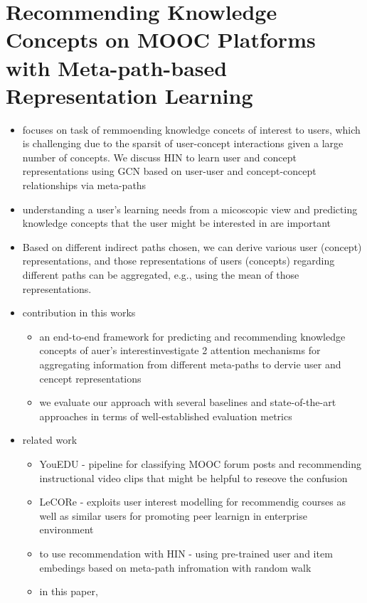 \documentclass{report}
\begin{document}
\section{Recommending Knowledge Concepts on MOOC Platforms with Meta-path-based Representation Learning}
\begin{itemize}
    \item focuses on  task of remmoending knowledge concets of interest to users, which is challenging due to the sparsit of user-concept interactions given a large number of concepts. We discuss HIN to learn user and concept representations using GCN based on user-user and concept-concept relationships via meta-paths
    \item understanding a user's learning needs from a micoscopic view and predicting knowledge concepts that the user might be interested in are important
    \item Based on different indirect paths chosen, we can derive various user (concept) representations, and those representations of users (concepts) regarding different paths can be aggregated, e.g., using the mean of those representations.
    \item contribution in this works
    \begin{itemize}
        \item an end-to-end framework for predicting and recommending knowledge concepts of auer's interestinvestigate 2 attention mechanisms for aggregating information from different meta-paths to dervie user and cencept representations
        \item we evaluate our approach with several baselines and state-of-the-art approaches in terms of well-established evaluation metrics
    \end{itemize}
    \item related work
    \begin{itemize}
        \item YouEDU - pipeline for classifying MOOC forum posts and recommending instructional video clips that might be helpful to reseove the confusion
        \item LeCORe - exploits user interest modelling for recommendig courses as well as similar users for promoting peer learnign in enterprise environment
        \item to use recommendation with HIN - using pre-trained user and item embedings based on meta-path infromation with random walk
        \item in this paper, 
        \begin{itemize}

\end{itemize}
\end{itemize}
\end{itemize}
\end{document}

